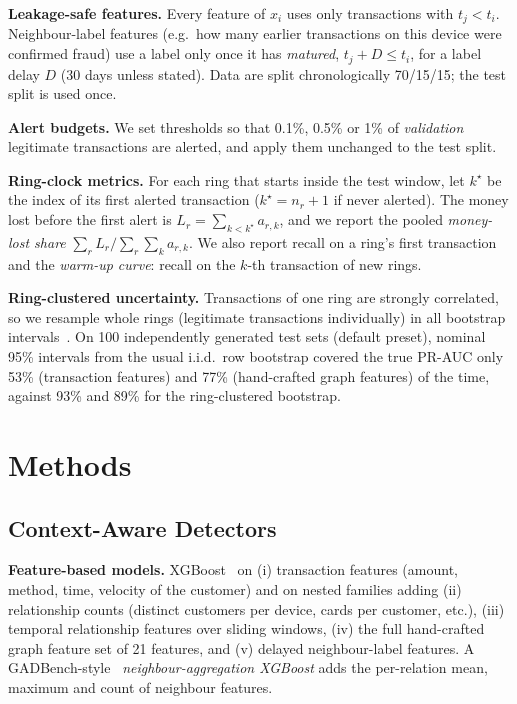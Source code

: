 \documentclass[10pt,letterpaper]{article}
\begin{document}
\textbf{Leakage-safe features.} Every feature of $x_i$ uses only transactions with $t_j<t_i$. Neighbour-label features (e.g.\ how many earlier transactions on this device were confirmed fraud) use a label only once it has \emph{matured}, $t_j+D\le t_i$, for a label delay $D$ (30 days unless stated). Data are split chronologically 70/15/15; the test split is used once.

\textbf{Alert budgets.} We set thresholds so that 0.1\%, 0.5\% or 1\% of \emph{validation} legitimate transactions are alerted, and apply them unchanged to the test split.

\textbf{Ring-clock metrics.} For each ring that starts inside the test window, let $k^\star$ be the index of its first alerted transaction ($k^\star=n_r+1$ if never alerted). The money lost before the first alert is $L_r=\sum_{k<k^\star}a_{r,k}$, and we report the pooled \emph{money-lost share} $\sum_r L_r/\sum_r\sum_k a_{r,k}$. We also report recall on a ring's first transaction and the \emph{warm-up curve}: recall on the $k$-th transaction of new rings.

\textbf{Ring-clustered uncertainty.} Transactions of one ring are strongly correlated, so we resample whole rings (legitimate transactions individually) in all bootstrap intervals~\cite{field2007bootstrap}. On 100 independently generated test sets (default preset), nominal 95\% intervals from the usual i.i.d.\ row bootstrap covered the true PR-AUC only 53\% (transaction features) and 77\% (hand-crafted graph features) of the time, against 93\% and 89\% for the ring-clustered bootstrap. 

\section{Methods}\label{sec:methods}
\subsection{Context-Aware Detectors}
\textbf{Feature-based models.} XGBoost~\cite{chen2016xgboost} on (i) transaction features (amount, method, time, velocity of the customer) and on nested families adding (ii) relationship counts (distinct customers per device, cards per customer, etc.), (iii) temporal relationship features over sliding windows, (iv) the full hand-crafted graph feature set of 21 features, and (v) delayed neighbour-label features. A GADBench-style~\cite{tang2023gadbench} \emph{neighbour-aggregation XGBoost} adds the per-relation mean, maximum and count of neighbour features.
\end{document}
